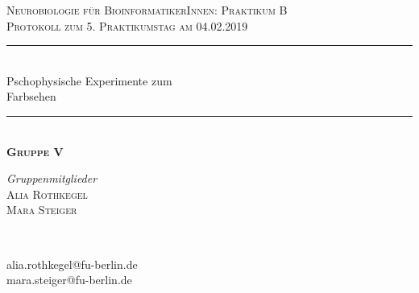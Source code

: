 \documentclass[11pt]{article}
\begin{document}
\begin{titlepage} %
	\newcommand{\HRule}{\rule{\linewidth}{0.5mm}} %
	
	\center %
	\vspace*{0.75cm}

	
	\textsc{\Large Neurobiologie für BioinformatikerInnen: Praktikum B}\\[0.65cm] %
	
	\textsc{\large Protokoll zum 5. Praktikumstag am 04.02.2019}\\[0.65cm] %

	\HRule\\[0.5cm]
	
	{\huge Pschophysische Experimente zum \\[0.2cm]Farbsehen}\\[0.3cm] %
	
	\HRule\\[0.75cm]
	\textsc{\Large\bfseries Gruppe V}
	\\[0.8cm]
	
\vfill

	\begin{minipage}{0.45\textwidth}
		\begin{flushleft}
			\large
			\textit{Gruppenmitglieder}\\
			\textsc{Alia Rothkegel}\\
			\textsc{Mara Steiger}
		\end{flushleft}
	\end{minipage}
	~
	\begin{minipage}{0.45\textwidth}
		\begin{flushright}
			\large \vspace{16pt}
			alia.rothkegel@fu-berlin.de\\
			mara.steiger@fu-berlin.de 
		\end{flushright}
	\end{minipage}
	
\vfill


\end{titlepage}
\end{document}
